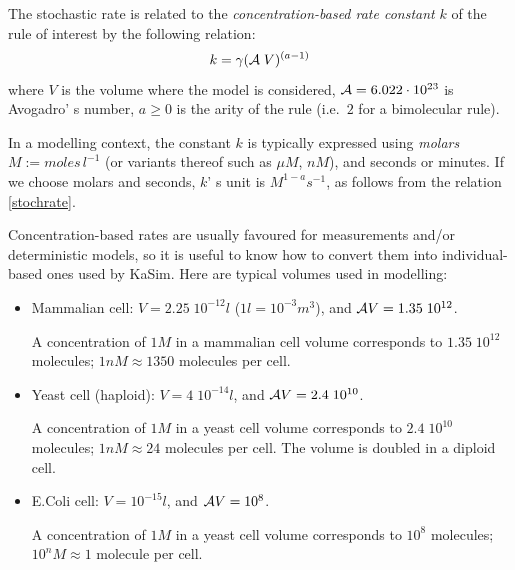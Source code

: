 \documentclass[11pt]{book}
\def\ga{\gamma}
\def\ie{i.e.~}
\def\mit#1{{\mathit #1}}
\begin{document}
The stochastic rate is related to the \emph{concentration-based rate
  constant} $k$ of the
rule of interest by the following relation:
%
%
\begin{equation}\label{stochrate}
k = \ga{({\cal A}\; V)^{(a-1)}} %
\end{equation}
where
$V$ is the volume where the model is considered,
${\cal A}= 6.022\cdot 10^{23}$ is Avogadro' s number, %
$a\geq0$ is the arity of the rule ({\ie}$2$ for a bimolecular rule).

In a modelling context, the constant $k$ is typically expressed using
\emph{molars} $M:=\mit{moles}\,l^{-1}$ (or variants thereof such as
$\mu M$, $nM$), and seconds or minutes. If we choose molars and
seconds, $k$' s unit is $\mathit{M}^{1-a}\mathit{s}^{-1}$, as follows
from the relation \ref{stochrate}.

Concentration-based rates are usually favoured for measurements and/or
deterministic models, so it is useful to know how to convert them into
individual-based ones used by KaSim.
Here are typical volumes used in modelling:
\begin{itemize}
\item Mammalian cell: $V=2.25\; 10^{-12}l$  ($1l=10^{-3}m^3$), and ${\cal A}V=1.35\; 10^{12}$.

A concentration of $1M$ in a mammalian cell volume corresponds to
$1.35\; 10^{12}$ molecules; $1nM\approx 1350$ molecules per cell.

\item
Yeast cell (haploid): $V=4\; 10^{-14}l$, and ${\cal A}V=2.4\; 10^{10}$.

A concentration of $1M$ in a yeast cell volume corresponds to $2.4\;
10^{10}$ molecules; $1nM\approx 24$ molecules per cell. The volume is
doubled in a diploid cell.
\item
E.\@ Coli cell: $V=10^{-15}l$, and ${\cal A}V=10^{8}$.

A concentration of $1M$ in a yeast cell volume corresponds to $10^{8}$
molecules; $10^{n}M\approx 1$ molecule per cell.
\end{itemize}
\end{document}

